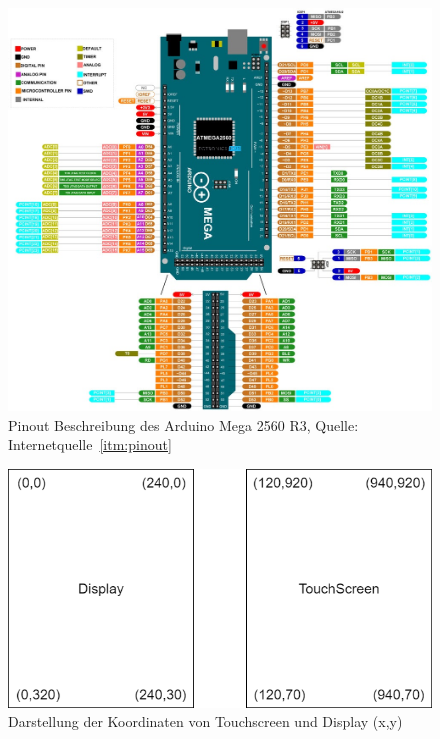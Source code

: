 \documentclass[a4paper, 11pt]{scrartcl}
\begin{document}
\begin{small}
\begin{figure}[H]
    \begin{center}
        \includegraphics[scale=2.5]{Bilder/Arduino-Mega-Pinout.jpg}
        \caption{Pinout Beschreibung des Arduino Mega 2560 R3, Quelle: Internetquelle~\ref{itm:pinout}}\label{diag:pinout}
    \end{center}
\end{figure}

\begin{figure}[H]
    \begin{center}
        \includegraphics[scale=0.5]{Bilder/touch_grafik_koord.png}
        \caption{Darstellung der Koordinaten von Touchscreen und Display (x,y)}\label{diag:diskrepanz}
    \end{center}
\end{figure}


\end{small}
\end{document}
